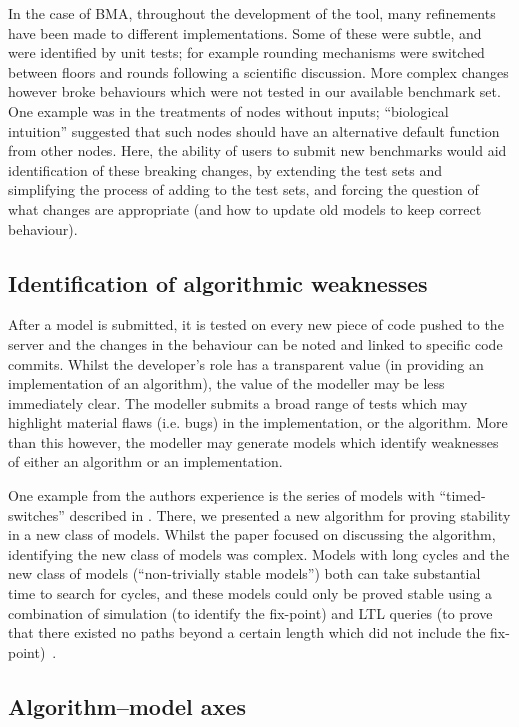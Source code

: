 \documentclass{llncs}
\begin{document}
In the case of BMA, throughout the development of the tool, many
refinements have been made to different implementations. Some of these
were subtle, and were identified by unit tests; for example rounding
mechanisms were switched between floors and rounds following a
scientific discussion. More complex changes however broke behaviours
which were not tested in our available benchmark set. One example was
in the treatments of nodes without inputs; ``biological intuition''
suggested that such nodes should have an alternative default function
from other nodes. Here, the ability of users to submit new benchmarks
would aid identification of these breaking changes, by extending the
test sets and simplifying the process of adding to the test sets, and
forcing the question of what changes are appropriate (and how to
update old models to keep correct behaviour).


\subsection{Identification of algorithmic weaknesses}

After a model is submitted, it is tested on every new piece of code
pushed to the server and the changes in the behaviour can be noted and
linked to specific code commits. Whilst the developer's role has a
transparent value (in providing an implementation of an algorithm),
the value of the modeller may be less immediately clear. The modeller
submits a broad range of tests which may highlight material flaws
(i.e. bugs) in the implementation, or the algorithm. More than this
however, the modeller may generate models which identify weaknesses of
either an algorithm or an implementation.

One example from the authors experience is the series of models with
``timed-switches'' described in \cite{cook2014}. There, we presented a
new algorithm for proving stability in a new class of models. Whilst
the paper focused on discussing the algorithm, identifying the new
class of models was complex. Models with long cycles and the new class
of models (``non-trivially stable models'') both can take substantial
time to search for cycles, and these models could only be proved
stable using a combination of simulation (to identify the fix-point)
and LTL queries (to prove that there existed no paths beyond a certain
length which did not include the fix-point)~\cite{piterman2013}.

\subsection{Algorithm--model axes}
\end{document}

